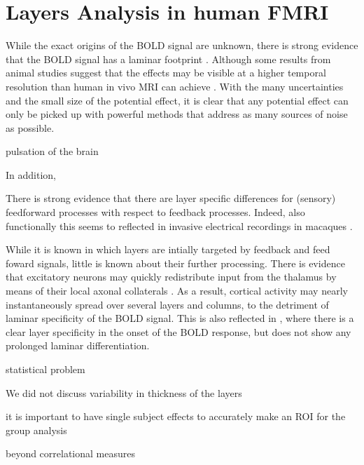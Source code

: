 \section{Layers Analysis in human FMRI}

While the exact origins of the BOLD signal are unknown, there is strong evidence that the BOLD signal has a laminar footprint \cite{Logothetis2001}. Although some results from animal studies suggest that the effects may be visible at a higher temporal resolution than human in vivo MRI can achieve \cite{Yu2014,OHerron2016}. With the many uncertainties and the small size of the potential effect, it is clear that any potential effect can only be picked up with powerful methods that address as many sources of noise as possible. 


pulsation of the brain 

In addition, 



There is strong evidence that there are layer specific differences for (sensory) feedforward processes with respect to feedback processes. Indeed, also functionally this seems to reflected in invasive electrical recordings in macaques \cite{Buffalo2011,Maier2010,Maier2011,VanKerkoerle2017}.

While it is known in which layers are intially targeted by feedback and feed foward signals, little is known about their further processing. There is evidence that excitatory neurons may quickly redistribute input from the thalamus by means of their local axonal collaterals \cite{Guy2017,ReyesPuerta2015}. As a result, cortical activity may nearly instantaneously spread over several layers and columns, to the detriment of laminar specificity of the BOLD signal.
This is also reflected in \cite{Yu2015}, where there is a clear layer specificity in the onset of the BOLD response, but does not show any prolonged laminar differentiation. 



statistical problem



\cite{Maass2014}


We did not discuss variability in thickness of the layers

\cite{Heinzle}

\cite{Renzo}



it is important to have single subject effects to accurately make an ROI for the group analysis

beyond correlational measures
